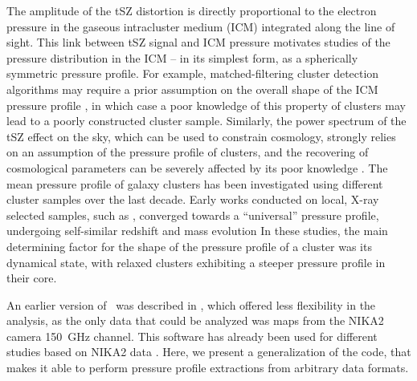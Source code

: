 The amplitude of the tSZ distortion is directly proportional to the electron pressure in the gaseous intracluster medium (ICM) integrated along the line of sight.
This link between tSZ signal and ICM pressure motivates studies of the pressure distribution in the ICM -- in its simplest form, as a spherically symmetric pressure profile.
For example, matched-filtering cluster detection algorithms may require a prior assumption on the overall shape of the ICM pressure profile \citep[\eg][]{melin_comparison_2012}, in which case a poor knowledge of this property of clusters may lead to a poorly constructed cluster sample.
Similarly, the power spectrum of the tSZ effect on the sky, which can be used to constrain cosmology, strongly relies on an assumption of the pressure profile of clusters, and the recovering of cosmological parameters can be severely affected by its poor knowledge \citep{ruppin_impact_2019}.
The mean pressure profile of galaxy clusters has been investigated using different cluster samples over the last decade.
Early works conducted on local, X-ray selected samples, such as \citet[][hereafter \aten]{arnaud_universal_2010}, converged towards a ``universal'' pressure profile, undergoing self-similar redshift and mass evolution \citep[see also \eg][]{battaglia_cluster_2012-1, planck_collaboration_planck_2013}
In these studies, the main determining factor for the shape of the pressure profile of a cluster was its dynamical state, with relaxed clusters exhibiting a steeper pressure profile in their core.

\textcolor{lightgray}{\lipsum[1]}


An earlier version of \panco\ was described in \citet{keruzore_panco2_2021}, which offered less flexibility in the analysis, as the only data that could be analyzed was maps from the NIKA2 camera 150~GHz channel\citep{adam_nika2_2018, perotto_calibration_2020}.
This software has already been used for different studies based on NIKA2 data \citep[\eg][]{artis_psz2_2022,munoz-echeverria_multi-probe_2022,munoz-echeverria_lpsz-clash_2022}.
Here, we present a generalization of the code, that makes it able to perform pressure profile extractions from arbitrary data formats.



\textcolor{lightgray}{\lipsum[2]}

